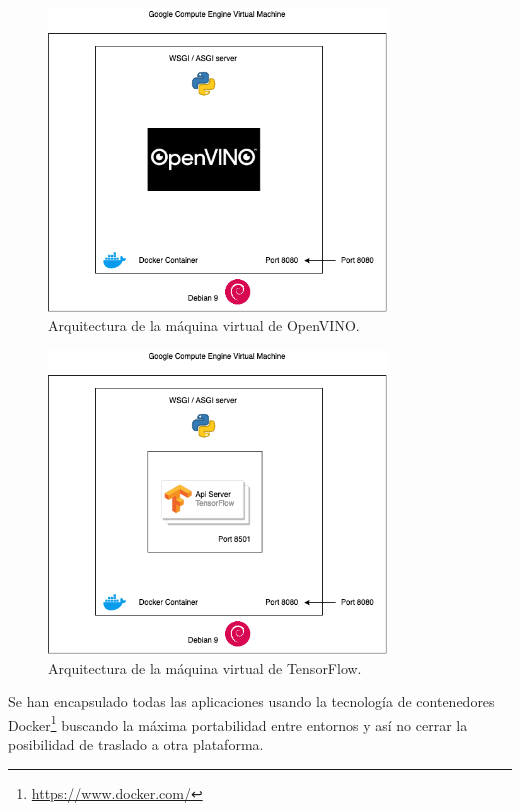 \begin{figure}[h]
    \centering
    \includegraphics[width=0.8\textwidth]{images/chapter4/openvino_ce.png}
    \caption{Arquitectura de la máquina virtual de OpenVINO.}
    \label{fig:Arquitectura de la máquina virtual de OpenVINO}
\end{figure}

\begin{figure}[h]
    \centering
    \includegraphics[width=0.8\textwidth]{images/chapter4/tensorflow_ce.png}
    \caption{Arquitectura de la máquina virtual de TensorFlow.}
    \label{fig:Arquitectura de la máquina virtual de TensorFlow}
\end{figure}

Se han encapsulado todas las aplicaciones usando la tecnología de contenedores Docker\footnote{\url{https://www.docker.com/}} buscando la máxima portabilidad entre entornos y así no cerrar la posibilidad de traslado a otra plataforma.

